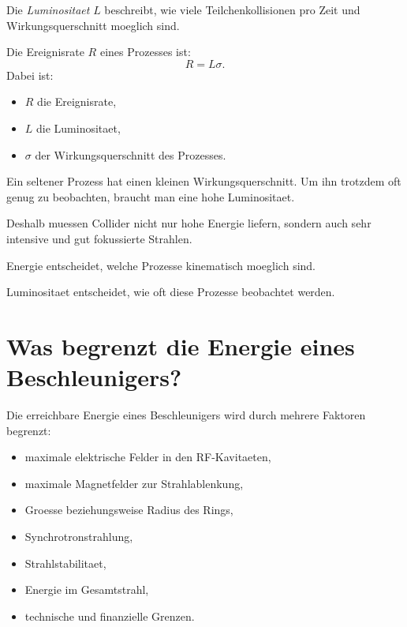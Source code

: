 \begin{definitionbox}
Die \emph{Luminositaet} $L$ beschreibt, wie viele Teilchenkollisionen pro Zeit und
Wirkungsquerschnitt moeglich sind.
\end{definitionbox}

\begin{formulabox}
Die Ereignisrate $R$ eines Prozesses ist:
\[
    R = L\sigma.
\]
Dabei ist:
\begin{itemize}
    \item $R$ die Ereignisrate,
    \item $L$ die Luminositaet,
    \item $\sigma$ der Wirkungsquerschnitt des Prozesses.
\end{itemize}
\end{formulabox}

\begin{conceptbox}
Ein seltener Prozess hat einen kleinen Wirkungsquerschnitt.
Um ihn trotzdem oft genug zu beobachten, braucht man eine hohe Luminositaet.

Deshalb muessen Collider nicht nur hohe Energie liefern, sondern auch sehr intensive
und gut fokussierte Strahlen.
\end{conceptbox}

\begin{examtipbox}
Energie entscheidet, welche Prozesse kinematisch moeglich sind.

Luminositaet entscheidet, wie oft diese Prozesse beobachtet werden.
\end{examtipbox}

\section{Was begrenzt die Energie eines Beschleunigers?}

\begin{conceptbox}
Die erreichbare Energie eines Beschleunigers wird durch mehrere Faktoren begrenzt:
\begin{itemize}
    \item maximale elektrische Felder in den RF-Kavitaeten,
    \item maximale Magnetfelder zur Strahlablenkung,
    \item Groesse beziehungsweise Radius des Rings,
    \item Synchrotronstrahlung,
    \item Strahlstabilitaet,
    \item Energie im Gesamtstrahl,
    \item technische und finanzielle Grenzen.
\end{itemize}
\end{conceptbox}

